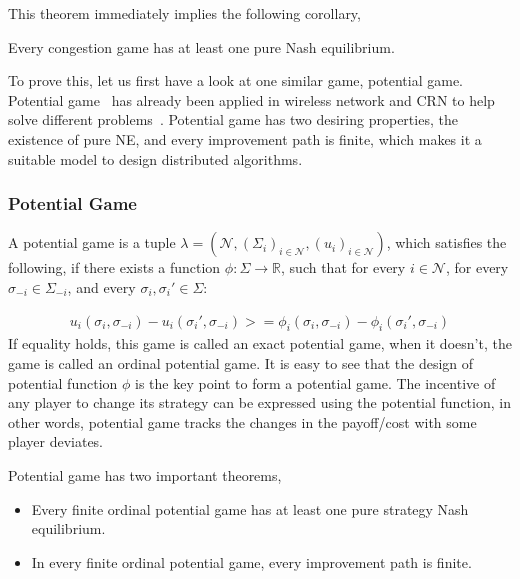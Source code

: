 This theorem immediately implies the following corollary,
\begin{corollary}
\label{background:corollary}
Every congestion game has at least one pure Nash equilibrium.~\cite{Rosenthal}
\end{corollary}

To prove this, let us first have a look at one similar game, potential game.
Potential game~\cite{Mondere_potential_game:1996} has already been applied in wireless network and CRN to help solve different problems~\cite{CApotentialLearning_05dyspan, caps_potential2012, self-coexistenceWRAN2010infocom, pimrc_2012}.
Potential game has two desiring properties, the existence of pure NE, and every improvement path is finite, which makes it a suitable model to design distributed algorithms.


\subsubsection{Potential Game}

A potential game is a tuple $\lambda=(\mathcal{N},(\Sigma_i)_{i \in \mathcal{N}},(u_i)_{i\in \mathcal{N}})$, which satisfies the following, if there exists a function $\phi: \Sigma\rightarrow \mathbb{R}$, such that for every $i\in \mathcal{N}$, for every $\sigma_{-i}\in \Sigma_{-i}$, and every $\sigma_i, \sigma_i'\in \Sigma$:

\begin{equation}
\label{2:1}
\begin{split}
u_i(\sigma_i, \sigma_{-i})-u_i(\sigma_i', \sigma_{-i}) >= \phi_i(\sigma_i, \sigma_{-i})-\phi_i(\sigma_i', \sigma_{-i})
\end{split}
\end{equation}
If equality holds, this game is called an exact potential game, when it doesn't, the game is called an ordinal potential game.
It is easy to see that the design of potential function $\phi$ is the key point to form a potential game. 
The incentive of any player to change its strategy can be expressed using the potential function, in other words, potential game tracks the changes in the payoff/cost with some player deviates.


Potential game has two important theorems,
\begin{itemize}
\item Every finite ordinal potential game has at least one pure strategy Nash equilibrium.
\item In every finite ordinal potential game, every improvement path is finite.

\end{itemize}

